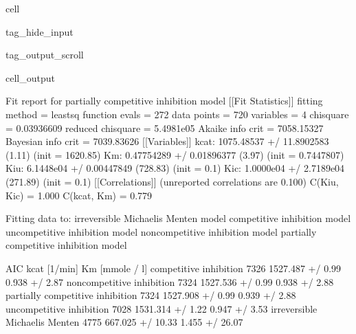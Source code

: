 \documentclass[letterpaper,10pt,english]{jupyterBook}
\begin{document}
\begin{sphinxuseclass}{cell}
\begin{sphinxuseclass}{tag_hide_input}
\begin{sphinxuseclass}{tag_output_scroll}
\begin{sphinxVerbatimOutput}
\begin{sphinxuseclass}{cell_output}
\begin{sphinxVerbatim}[commandchars=\\\{\}]
Fit report for partially competitive inhibition model
[[Fit Statistics]]
    \PYGZsh{} fitting method   = leastsq
    \PYGZsh{} function evals   = 272
    \PYGZsh{} data points      = 720
    \PYGZsh{} variables        = 4
    chi\PYGZhy{}square         = 0.03936609
    reduced chi\PYGZhy{}square = 5.4981e\PYGZhy{}05
    Akaike info crit   = \PYGZhy{}7058.15327
    Bayesian info crit = \PYGZhy{}7039.83626
[[Variables]]
    k\PYGZus{}cat:  1075.48537 +/\PYGZhy{} 11.8902583 (1.11\PYGZpc{}) (init = 1620.85)
    Km:     0.47754289 +/\PYGZhy{} 0.01896377 (3.97\PYGZpc{}) (init = 0.7447807)
    K\PYGZus{}iu:   6.1448e\PYGZhy{}04 +/\PYGZhy{} 0.00447849 (728.83\PYGZpc{}) (init = 0.1)
    K\PYGZus{}ic:   1.0000e\PYGZhy{}04 +/\PYGZhy{} 2.7189e\PYGZhy{}04 (271.89\PYGZpc{}) (init = 0.1)
[[Correlations]] (unreported correlations are \PYGZlt{} 0.100)
    C(K\PYGZus{}iu, K\PYGZus{}ic) = \PYGZhy{}1.000
    C(k\PYGZus{}cat, Km)  = 0.779
\end{sphinxVerbatim}

\noindent{}

\begin{sphinxVerbatim}[commandchars=\\\{\}]
Fitting data to:
 \PYGZhy{} irreversible Michaelis Menten model
 \PYGZhy{} competitive inhibition model
 \PYGZhy{} uncompetitive inhibition model
 \PYGZhy{} non\PYGZhy{}competitive inhibition model
 \PYGZhy{} partially competitive inhibition model
\end{sphinxVerbatim}

\begin{sphinxVerbatim}[commandchars=\\\{\}]
                                   AIC        kcat [1/min]    Km [mmole / l]  \PYGZbs{}
competitive inhibition           \PYGZhy{}7326  1527.487 +/\PYGZhy{} 0.99\PYGZpc{}   0.938 +/\PYGZhy{} 2.87\PYGZpc{}   
non\PYGZhy{}competitive inhibition       \PYGZhy{}7324  1527.536 +/\PYGZhy{} 0.99\PYGZpc{}   0.938 +/\PYGZhy{} 2.88\PYGZpc{}   
partially competitive inhibition \PYGZhy{}7324  1527.908 +/\PYGZhy{} 0.99\PYGZpc{}   0.939 +/\PYGZhy{} 2.88\PYGZpc{}   
uncompetitive inhibition         \PYGZhy{}7028  1531.314 +/\PYGZhy{} 1.22\PYGZpc{}   0.947 +/\PYGZhy{} 3.53\PYGZpc{}   
irreversible Michaelis Menten    \PYGZhy{}4775  667.025 +/\PYGZhy{} 10.33\PYGZpc{}  1.455 +/\PYGZhy{} 26.07\PYGZpc{}   


\end{sphinxVerbatim}
\end{sphinxuseclass}
\end{sphinxVerbatimOutput}
\end{sphinxuseclass}
\end{sphinxuseclass}
\end{sphinxuseclass}
\end{document}
